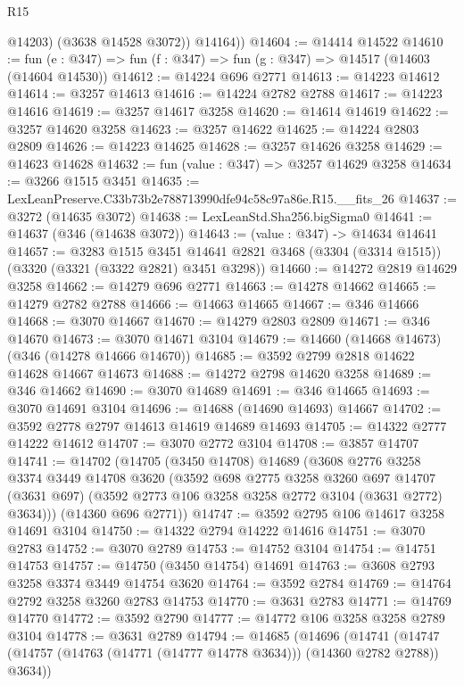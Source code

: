 \begin{lexlean}{R15}
\begin{coremodule}
            @14203)
          (@3638 @14528 @3072))
        @14164))
@14604 := @14414 @14522
@14610 := fun (e : @347) => fun (f : @347) => fun (g : @347) => @14517 (@14603 (@14604 @14530))
@14612 := @14224 @696 @2771
@14613 := @14223 @14612
@14614 := @3257 @14613
@14616 := @14224 @2782 @2788
@14617 := @14223 @14616
@14619 := @3257 @14617 @3258
@14620 := @14614 @14619
@14622 := @3257 @14620 @3258
@14623 := @3257 @14622
@14625 := @14224 @2803 @2809
@14626 := @14223 @14625
@14628 := @3257 @14626 @3258
@14629 := @14623 @14628
@14632 := fun (value : @347) => @3257 @14629 @3258
@14634 := @3266 @1515 @3451
@14635 := LexLeanPreserve.C33b73b2e788713990dfe94c58c97a86e.R15.__fits_26
@14637 := @3272 (@14635 @3072)
@14638 := LexLeanStd.Sha256.bigSigma0
@14641 := @14637 (@346 (@14638 @3072))
@14643 := (value : @347) -> @14634 @14641
@14657 := @3283
    @1515
    @3451
    @14641
    @2821
    @3468
    (@3304 (@3314 @1515))
    (@3320 (@3321 (@3322 @2821) @3451 @3298))
@14660 := @14272 @2819 @14629 @3258
@14662 := @14279 @696 @2771
@14663 := @14278 @14662
@14665 := @14279 @2782 @2788
@14666 := @14663 @14665
@14667 := @346 @14666
@14668 := @3070 @14667
@14670 := @14279 @2803 @2809
@14671 := @346 @14670
@14673 := @3070 @14671 @3104
@14679 := @14660 (@14668 @14673) (@346 (@14278 @14666 @14670))
@14685 := @3592 @2799 @2818 @14622 @14628 @14667 @14673
@14688 := @14272 @2798 @14620 @3258
@14689 := @346 @14662
@14690 := @3070 @14689
@14691 := @346 @14665
@14693 := @3070 @14691 @3104
@14696 := @14688 (@14690 @14693) @14667
@14702 := @3592 @2778 @2797 @14613 @14619 @14689 @14693
@14705 := @14322 @2777 @14222 @14612
@14707 := @3070 @2772 @3104
@14708 := @3857 @14707
@14741 := @14702
    (@14705
      (@3450 @14708)
      @14689
      (@3608
        @2776
        @3258
        @3374
        @3449
        @14708
        @3620
        (@3592
          @698
          @2775
          @3258
          @3260
          @697
          @14707
          (@3631 @697)
          (@3592 @2773 @106 @3258 @3258 @2772 @3104 (@3631 @2772) @3634)))
      (@14360 @696 @2771))
@14747 := @3592 @2795 @106 @14617 @3258 @14691 @3104
@14750 := @14322 @2794 @14222 @14616
@14751 := @3070 @2783
@14752 := @3070 @2789
@14753 := @14752 @3104
@14754 := @14751 @14753
@14757 := @14750 (@3450 @14754) @14691
@14763 := @3608 @2793 @3258 @3374 @3449 @14754 @3620
@14764 := @3592 @2784
@14769 := @14764 @2792 @3258 @3260 @2783 @14753
@14770 := @3631 @2783
@14771 := @14769 @14770
@14772 := @3592 @2790
@14777 := @14772 @106 @3258 @3258 @2789 @3104
@14778 := @3631 @2789
@14794 := @14685
    (@14696
      (@14741 (@14747 (@14757 (@14763 (@14771 (@14777 @14778 @3634))) (@14360 @2782 @2788)) @3634))

\end{coremodule}
\end{lexlean}
